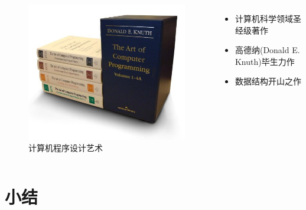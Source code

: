 \begin{frame}{\insertsubsectionhead}
    \begin{columns}
        \vspace{4ex}
        \begin{figure}
            \centering
            \includegraphics[height=0.6\textheight]{images/taocp.jpg}
            \caption{计算机程序设计艺术\cite{knuth1997art}}
            \label{fig:knuth1997art}
        \end{figure}
        \begin{itemize}
            \item 计算机科学领域圣经级著作
            \item 高德纳(Donald E. Knuth)毕生力作
            \item 数据结构开山之作
        \end{itemize}
    \end{columns}
\end{frame}

\section{小结}

